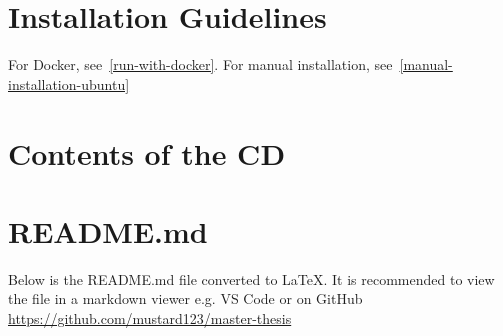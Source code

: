 \appendix

\chapter{Installation Guidelines}
For Docker, see~\ref{run-with-docker}.
For manual installation, see~\ref{manual-installation-ubuntu}

\chapter{Contents of the CD}

\chapter{README.md}
Below is the README.md file converted to \LaTeX. It is
recommended to view the file in a markdown viewer e.g. VS Code or on GitHub \url{https://github.com/mustard123/master-thesis}



